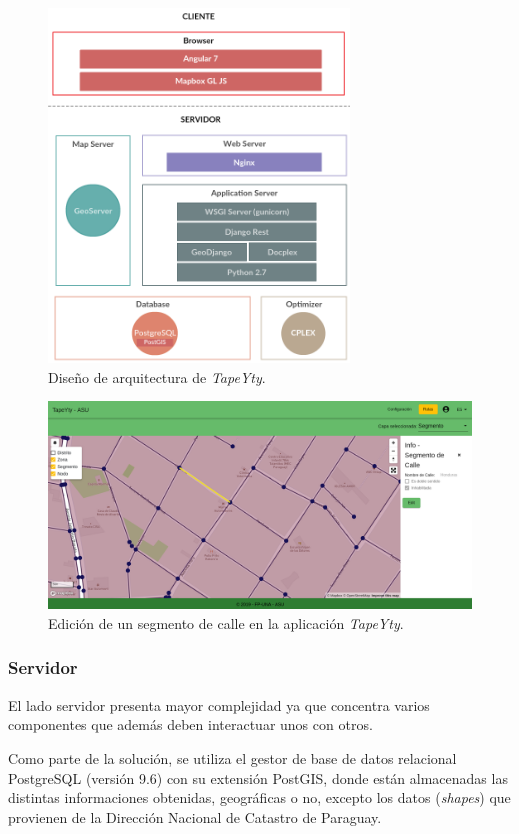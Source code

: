 \documentclass[spanish, conference]{IEEEtran}
\begin{document}
\begin{figure}[tbp]
\centerline{\includegraphics[width=8cm]{imagenes/20190424_WebAppArchitectureDesign.png}}
\caption{Diseño de arquitectura de \textit{TapeYty}.}
\label{fig:disenhoArquitectura}
\end{figure}

\begin{figure}[tbp]
\centerline{\includegraphics[width=\textwidth]{imagenes/20190426_Aplicacion_Rutas.png}}
\caption{Edición de un segmento de calle en la aplicación \textit{TapeYty}.}
\label{fig:aplicacionRutas}
\end{figure}

\subsubsection{Servidor}

El lado servidor presenta mayor complejidad ya que concentra varios componentes que además deben interactuar unos con otros.

Como parte de la solución, se utiliza el gestor de base de datos relacional PostgreSQL (versión 9.6) con su extensión PostGIS, donde están almacenadas las distintas informaciones obtenidas, geográficas o no, excepto los datos (\textit{shapes}) que provienen de la Dirección Nacional de Catastro de Paraguay.
\end{document}
